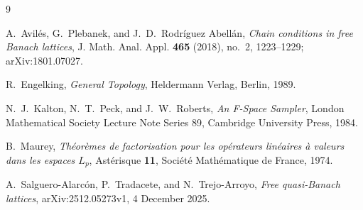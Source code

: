 \documentclass[11pt]{article}
\theoremstyle{definition}
\begin{document}
\begin{thebibliography}{9}

A.~Avil\'es, G.~Plebanek, and J.~D.~Rodr\'iguez Abell\'an,
\emph{Chain conditions in free Banach lattices},
J. Math. Anal. Appl. \textbf{465} (2018), no.~2, 1223--1229;
arXiv:1801.07027.

R.~Engelking,
\emph{General Topology},
Heldermann Verlag, Berlin, 1989.

N.~J.~Kalton, N.~T.~Peck, and J.~W.~Roberts,
\emph{An F-Space Sampler},
London Mathematical Society Lecture Note Series 89,
Cambridge University Press, 1984.

B.~Maurey,
\emph{Th\'eor\`emes de factorisation pour les op\'erateurs lin\'eaires \`a valeurs
dans les espaces $L_p$},
Ast\'erisque \textbf{11}, Soci\'et\'e Math\'ematique de France, 1974.

A.~Salguero-Alarc\'on, P.~Tradacete, and N.~Trejo-Arroyo,
\emph{Free quasi-Banach lattices},
arXiv:2512.05273v1, 4 December 2025.

\end{thebibliography}
\end{document}
